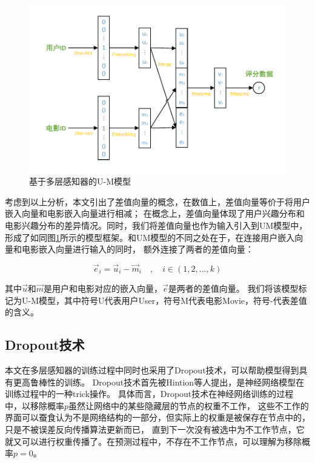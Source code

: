 \begin{figure}[htbp]
\centering
\includegraphics[scale=0.7]{images/a_b_a-b.pdf}
\caption{基于多层感知器的U-M模型}
\label{fig:a_b_a-b}
\end{figure}

考虑到以上分析，本文引出了差值向量的概念，在数值上，差值向量等价于将用户嵌入向量和电影嵌入向量进行相减；
在概念上，差值向量体现了用户兴趣分布和电影兴趣分布的差异情况。同时，我们将差值向量也作为输入引入到UM模型中，
形成了如同图\ref{fig:a_b_a-b}所示的模型框架。和UM模型的不同之处在于，在连接用户嵌入向量和电影嵌入向量进行输入的同时，
额外连接了两者的差值向量：

\begin{equation}
\vec{e}_i = \vec{u}_i - \vec{m}_i \quad , \quad i \in (1,2,...,k)
\end{equation}

其中$\vec{u}$和$\vec{m}$是用户和电影对应的嵌入向量，$\vec{e}$是两者的差值向量。
我们将该模型标记为U-M模型，其中符号U代表用户User，符号M代表电影Movie，符号-代表差值的含义。

\subsection{Dropout技术}
本文在多层感知器的训练过程中同时也采用了Dropout技术，可以帮助模型得到具有更高鲁棒性的训练。
Dropout技术首先被Hintion等人\parencite{hinton2012improving}提出，是神经网络模型在训练过程中的一种trick操作。
具体而言，Dropout技术在神经网络训练的过程中，以移除概率$p$虽然让网络中的某些隐藏层的节点的权重不工作，
这些不工作的界面可以蚕食认为不是网络结构的一部分，但实际上的权重是被保存在节点中的，只是不被误差反向传播算法更新而已，
直到下一次没有被选中为不工作节点，它就又可以进行权重传播了。在预测过程中，不存在不工作节点，可以理解为移除概率$p=0$。

